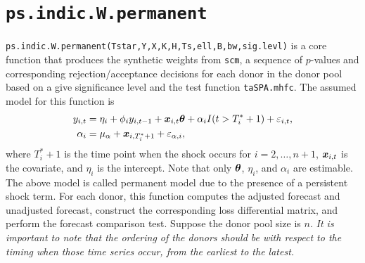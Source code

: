 \documentclass[12pt]{article}
\begin{document}
 
 
 \section{\texttt{ps.indic.W.permanent}}
 
 \texttt{ps.indic.W.permanent(Tstar,Y,X,K,H,Ts,ell,B,bw,sig.levl)} is a core function that produces the synthetic weights from \texttt{scm}, a sequence of $p$-values and corresponding rejection/acceptance decisions for each donor in the donor pool based on a give significance level and the test  function \texttt{taSPA.mhfc}. The assumed model for this function is
 \begin{align*}
 	y_{i,t} &= \eta_i + \phi_i y_{i, t-1}  + \boldsymbol{x}_{i, t}\boldsymbol{\theta} + \alpha_i I(t > T_i^*+1) + \varepsilon_{i,t},\\
 	\alpha_i & = \mu_{\alpha} + \boldsymbol{x}_{i, T_i^*+1} + \varepsilon_{\alpha, i},
 \end{align*}
 where $T_i^*+1$ is the time point when the shock occurs for $i = 2, \ldots, n+1$, $\boldsymbol{x}_{i,t}$ is the covariate, and $\eta_i$ is the intercept. Note that only $\boldsymbol{\theta}$, $\eta_i$, and $\alpha_i$ are estimable. The above model is called permanent model due to the presence of a persistent shock term. For each donor, this function computes the adjusted forecast and unadjusted forecast, construct the corresponding loss differential matrix, and perform the forecast comparison test.  Suppose the donor pool size is $n$. \emph{It is important to note that the ordering of the donors should be with respect to the timing when those time series occur, from the earliest to the latest.}
 
\end{document}
